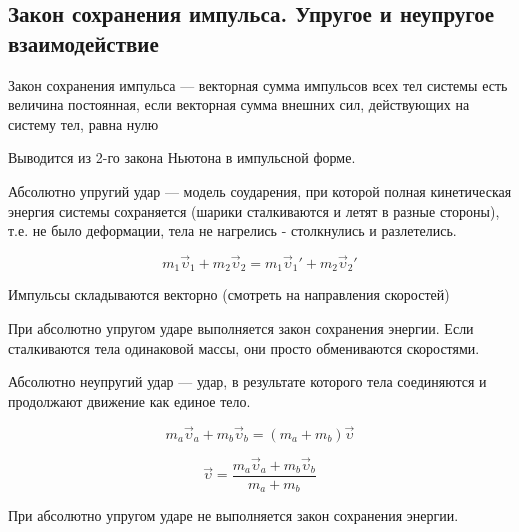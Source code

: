 \subsection{Закон сохранения импульса. Упругое и неупругое взаимодействие}

\begin{definition}
    Закон сохранения импульса — векторная сумма импульсов всех тел системы есть величина постоянная, 
    если векторная сумма внешних сил, действующих на систему тел, равна нулю
\end{definition}

Выводится из 2-го закона Ньютона в импульсной форме.

\begin{definition}
    Абсолютно упругий удар — модель соударения, при которой полная кинетическая энергия системы сохраняется 
    (шарики сталкиваются и летят в разные стороны), т.е. не было деформации, тела не нагрелись - столкнулись и разлетелись.
\end{definition}

$$m_1\vec\upsilon_1+m_2\vec\upsilon_2=m_1\vec\upsilon_1'+m_2\vec\upsilon_2'$$

\begin{remark}
    Импульсы складываются векторно (смотреть на направления скоростей)
\end{remark}

При абсолютно упругом ударе выполняется закон сохранения энергии.
Если сталкиваются тела одинаковой массы, они просто обмениваются скоростями.

\begin{definition}
    Абсолютно неупругий удар — удар, в результате которого тела соединяются и продолжают движение как единое тело.
\end{definition}

$$m_a\vec\upsilon_a+m_b\vec\upsilon_b=(m_a+m_b)\vec\upsilon$$

$$\vec\upsilon=\frac{m_a\vec\upsilon_a+m_b\vec\upsilon_b}{m_a+m_b}$$

При абсолютно упругом ударе не выполняется закон сохранения энергии.